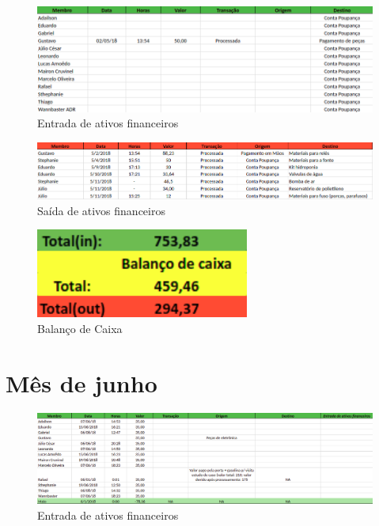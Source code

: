 \begin{figure}[!htb]
	\centering
	\includegraphics[width=17cm]{figuras/entrada_ativos_maio.png}
	\caption{Entrada de ativos financeiros} \label{entrada_ativos_maio}
\end{figure}

\begin{figure}[!htb]
	\centering
	\includegraphics[width=17cm]{figuras/saida_ativos_maio.png}
	\caption{Saída de ativos financeiros} \label{saida_ativos_maio}
\end{figure}

\begin{figure}[!htb]
	\centering
	\includegraphics[width=7cm]{figuras/balanco_maio.png}
	\caption{Balanço de Caixa} \label{balanco_maio}
\end{figure}

\section{Mês de junho}

\begin{figure}[!htb]
	\centering
	\includegraphics[width=17cm]{figuras/entrada_ativos_junho.png}
	\caption{Entrada de ativos financeiros} \label{entrada_ativos_junho}
\end{figure}

